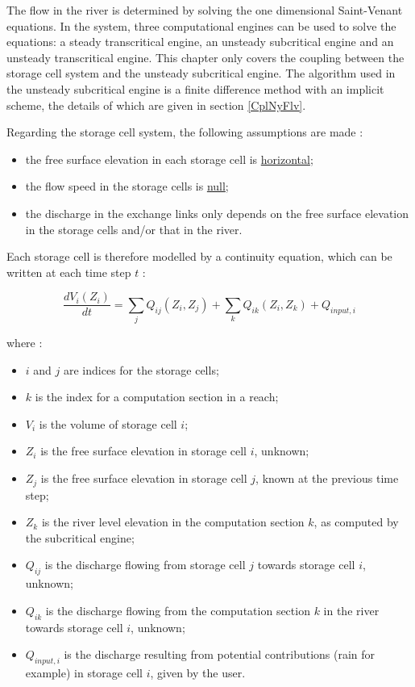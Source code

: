 The flow in the river is determined by solving the one dimensional Saint-Venant equations. In the \mascaret{} system, three computational engines can be used to solve the equations: a steady transcritical engine, an unsteady subcritical engine and an unsteady transcritical engine. This chapter only covers the coupling between the storage cell system and the unsteady subcritical engine. The algorithm used in the unsteady subcritical engine is a finite difference method with an implicit scheme, the details of which are given in section \ref{CplNyFlv}.

Regarding the storage cell system, the following assumptions are made :
\begin{itemize}
 \item the free surface elevation in each storage cell is \underline{horizontal};
 \item the flow speed in the storage cells is \underline{null};
 \item the discharge in the exchange links only depends on the free surface elevation in the storage cells and/or that in the river.
\end{itemize}

Each storage cell is therefore modelled by a continuity equation, which can be written at each time step $t$ :

\begin{equation}
 \label{EqCas}
 \frac{dV_{i}(Z_i)}{dt} = \sum_j Q_{ij} (Z_i,Z_j) + \sum_k Q_{ik} (Z_i,Z_k) + Q_{input,i}
\end{equation}

where :

\begin{itemize}
 \item $i$ and $j$ are indices for the storage cells;
 \item $k$ is the index for a computation section in a reach;
 \item $V_i$ is the volume of storage cell $i$;
 \item $Z_i$ is the free surface elevation in storage cell $i$, unknown;
 \item $Z_j$ is the free surface elevation in storage cell $j$, known at the previous time step;
 \item $Z_k$ is the river level elevation in the computation section $k$, as computed by the subcritical engine;
 \item $Q_{ij}$ is the discharge flowing from storage cell $j$ towards storage cell $i$, unknown;
 \item $Q_{ik}$ is the discharge flowing from the computation section $k$ in the river towards storage cell $i$, unknown;
 \item $Q_{input,i}$ is the discharge resulting from potential contributions (rain for example) in storage cell $i$, given by the user.
\end{itemize}

